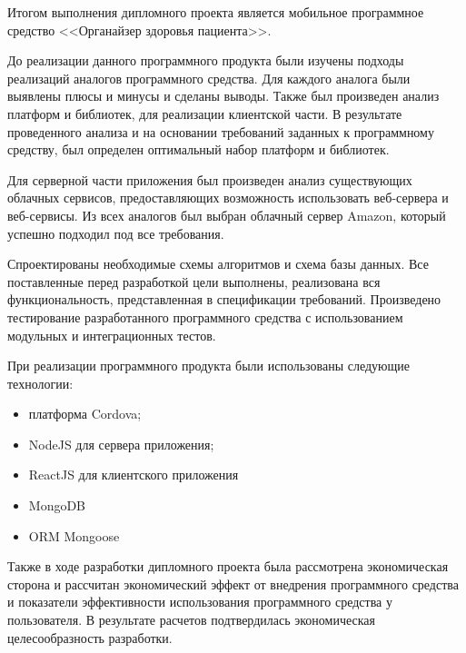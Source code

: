 
Итогом выполнения дипломного проекта является мобильное программное средство <<Органайзер здоровья пациента>>.

До реализации данного программного продукта были изучены подходы реализаций аналогов программного средства. Для каждого аналога были выявлены плюсы и минусы и сделаны выводы. Также был произведен анализ платформ и библиотек, для реализации клиентской части. В результате проведенного анализа и на основании требований заданных к программному средству, был определен оптимальный набор платформ и библиотек.

Для серверной части приложения был произведен анализ существующих облачных сервисов, предоставляющих возможность использовать веб-сервера и веб-сервисы. Из всех аналогов был выбран облачный сервер Amazon, который успешно подходил под все требования.

Спроектированы необходимые схемы алгоритмов и схема базы данных. Все поставленные перед разработкой цели выполнены, реализована вся функциональность, представленная в спецификации требований. Произведено тестирование разработанного программного средства с использованием модульных и интеграционных тестов.

При реализации программного продукта были использованы следующие технологии:

\begin{itemize}
  \item платформа Cordova;
  \item NodeJS для сервера приложения;
  \item ReactJS для клиентского приложения
  \item MongoDB
  \item ORM Mongoose
\end{itemize}

Также в ходе разработки дипломного проекта была рассмотрена экономическая сторона и рассчитан экономический эффект от внедрения программного средства и показатели эффективности использования программного средства у пользователя. В результате расчетов подтвердилась экономическая целесообразность разработки. 